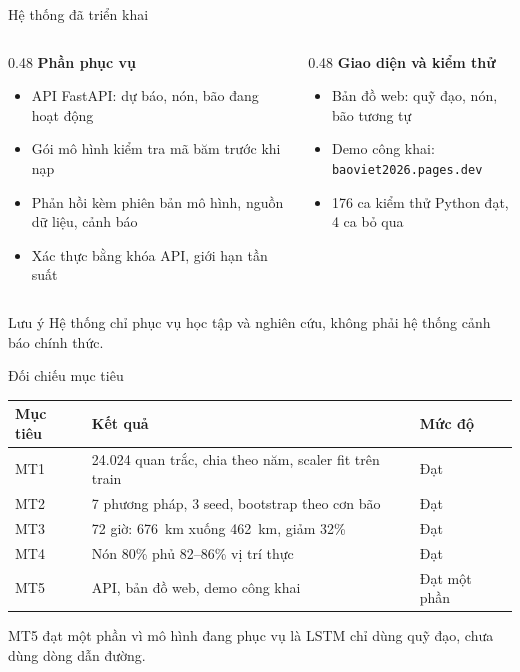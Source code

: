 \documentclass[aspectratio=169, 11pt]{beamer}
\begin{document}
\begin{frame}{Hệ thống đã triển khai}
  \begin{columns}[T]
    \begin{column}{0.48\textwidth}
      \textbf{Phần phục vụ}
      \begin{itemize}
        \item API FastAPI: dự báo, nón, bão đang hoạt động
        \item Gói mô hình kiểm tra mã băm trước khi nạp
        \item Phản hồi kèm phiên bản mô hình, nguồn dữ liệu, cảnh báo
        \item Xác thực bằng khóa API, giới hạn tần suất
      \end{itemize}
    \end{column}
    \begin{column}{0.48\textwidth}
      \textbf{Giao diện và kiểm thử}
      \begin{itemize}
        \item Bản đồ web: quỹ đạo, nón, bão tương tự
        \item Demo công khai: \texttt{baoviet2026.pages.dev}
        \item \alert{176 ca kiểm thử Python đạt}, 4 ca bỏ qua
      \end{itemize}
    \end{column}
  \end{columns}
  \vspace{0.8em}
  \begin{block}{Lưu ý}
    Hệ thống chỉ phục vụ học tập và nghiên cứu, không phải hệ thống cảnh báo
    chính thức.
  \end{block}
\end{frame}

\begin{frame}{Đối chiếu mục tiêu}
  \centering
  \begin{tabular}{lll}
    \toprule
    \textbf{Mục tiêu} & \textbf{Kết quả} & \textbf{Mức độ} \\
    \midrule
    MT1 & 24.024 quan trắc, chia theo năm, scaler fit trên train & Đạt \\
    MT2 & 7 phương pháp, 3 seed, bootstrap theo cơn bão & Đạt \\
    MT3 & 72 giờ: 676~km xuống 462~km, giảm 32\% & Đạt \\
    MT4 & Nón 80\% phủ 82--86\% vị trí thực & Đạt \\
    MT5 & API, bản đồ web, demo công khai & Đạt một phần \\
    \bottomrule
  \end{tabular}

  \vspace{0.8em}
  \raggedright
  MT5 đạt một phần vì mô hình đang phục vụ là LSTM chỉ dùng quỹ đạo, chưa dùng
  dòng dẫn đường.
\end{frame}
\end{document}
